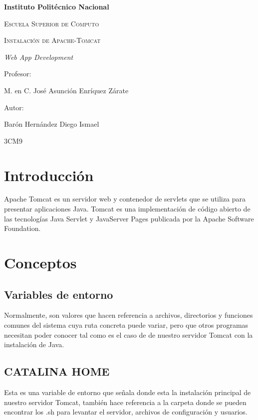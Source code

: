 \documentclass{article}
\begin{document}
	\begin{titlepage}
		\centering
		{\bfseries\LARGE Instituto Politécnico Nacional \par}
		\vspace{1cm}
		{\scshape\Large Escuela Superior de Computo \par}
		\vspace{3cm}
		{\scshape\Huge Instalación de Apache-Tomcat \par}
		\vspace{3cm}
		{\itshape\Large Web App Development \par}
		\vfill
		{\Large Profesor: \par}
		{\Large M. en C. José Asunción Enríquez Zárate \par}
		\vspace{1cm}
		{\Large Autor: \par}
		{\Large Barón Hernández Diego Ismael \par}
		\vfill
		{\Large 3CM9 \par}
	\end{titlepage}
	\newpage
	\tableofcontents
	\newpage
	\section{Introducción}
		Apache Tomcat es un servidor web y contenedor de servlets que se utiliza para presentar aplicaciones Java. Tomcat es una implementación de código abierto de las tecnologías Java Servlet y JavaServer Pages publicada por la Apache Software Foundation.
	\section{Conceptos}
		\subsection{Variables de entorno}
			Normalmente, son valores que hacen referencia a archivos, directorios y funciones comunes del sistema cuya ruta concreta puede variar, pero que otros programas necesitan poder conocer tal como es el caso de de nuestro servidor Tomcat con la instalación de Java.
		\subsection{CATALINA HOME}
			Esta es una variable de entorno que señala donde esta la instalación principal de nuestro servidor Tomcat, también hace referencia a la carpeta donde se pueden encontrar los .sh para levantar el servidor, archivos de configuración y usuarios.
\end{document}
